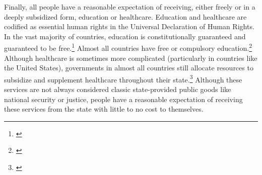 \documentclass[12pt, letterpaper]{article}
\begin{document}
Finally, all people have a reasonable expectation of receiving, either freely or in a deeply subsidized form, education or healthcare. Education and healthcare are codified as essential human rights in the Universal Declaration of Human Rights. In the vast majority of countries, education is constitutionally guaranteed and guaranteed to be free.\footnote{\citealt{worldpolicy}} Almost all countries have free or compulsory education.\footnote{\citealt[32-80]{tom2001}} Although healthcare is sometimes more complicated (particularly in countries like the United States), governments in almost all countries still allocate resources to subsidize and supplement healthcare throughout their state.\footnote{\citealt{worldbankhealth}} Although these services are not always considered classic state-provided public goods like national security or justice, people have a reasonable expectation of receiving these services from the state with little to no cost to themselves.  
\end{document}
